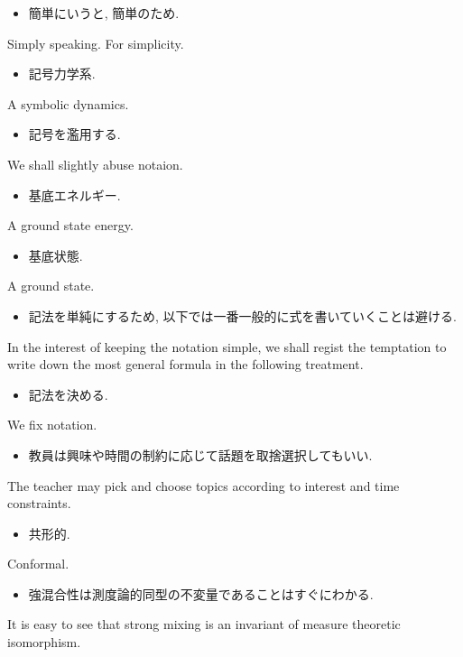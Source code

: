 \documentclass[openany, a4paper, oneside]{jsbook}
\begin{document}
\begin{itemize}
\item 簡単にいうと, 簡単のため. \cite{LiebSeiringer1}
\end{itemize}
Simply speaking.
For simplicity.

\begin{itemize}
\item 記号力学系.
\end{itemize}
A symbolic dynamics.

\begin{itemize}
\item 記号を濫用する. \cite{LiebSeiringer1}
\end{itemize}
We shall slightly abuse notaion.

\begin{itemize}
\item 基底エネルギー.
\end{itemize}
A ground state energy.

\begin{itemize}
\item 基底状態.
\end{itemize}
A ground state.

\begin{itemize}
\item 記法を単純にするため, 以下では一番一般的に式を書いていくことは避ける. \cite{LiebSeiringer1}
\end{itemize}
In the interest of keeping the notation simple, we shall regist the temptation to write down
the most general formula in the following treatment.

\begin{itemize}
\item 記法を決める.
\end{itemize}
We fix notation.

\begin{itemize}
\item 教員は興味や時間の制約に応じて話題を取捨選択してもいい. \cite{CharlesWeibel1}
\end{itemize}
The teacher may pick and choose topics according to interest and time constraints.

\begin{itemize}
\item 共形的.
\end{itemize}
Conformal.

\begin{itemize}
\item 強混合性は測度論的同型の不変量であることはすぐにわかる.
\end{itemize}
It is easy to see that strong mixing is an invariant of measure theoretic isomorphism.
\end{document}
